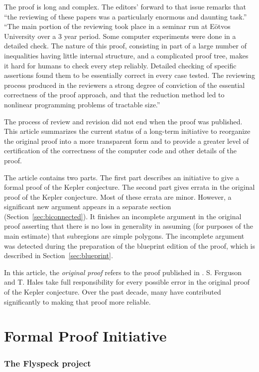 \documentclass[11pt]{amsart}
\begin{document}
The proof is long and complex.  The editors' forward to that issue remarks
that ``the reviewing of these papers was a particularly enormous and daunting task.''
``The main portion of the reviewing took place in a seminar run at E\"otvos University
over a 3 year period.  Some computer experiments were done in a detailed check.
The nature of this proof, consisting in part of a large number of inequalities having
little internal structure, and a complicated proof tree, makes it hard for humans
to check every step reliably.  Detailed checking of specific assertions found them to
be essentially correct in every case tested.  The reviewing process produced in the
reviewers a strong degree of conviction of the essential correctness of the proof
approach, and that the reduction method led to nonlinear programming problems of
tractable size.''

The process of review and revision did not end when the proof was published.
This article summarizes the current status of a long-term initiative to
reorganize the original proof into a more transparent form and to provide a greater
level of certification of the correctness of the computer code and other details of the proof.  

The article contains two parts.  The first part describes
an initiative to give a formal proof of the Kepler conjecture.  The second part gives errata in the original proof of the Kepler conjecture.  Most of these errata are minor.  However, a significant new argument appears in a separate section (Section~\ref{sec:biconnected}).  It finishes an incomplete argument in the original proof asserting that there is no loss in generality in assuming (for purposes of the main estimate) that subregions are simple polygons.  The incomplete argument was detected during the preparation of the blueprint edition of the proof, which is described in Section~\ref{sec:blueprint}.

In this article, the {\it original proof} refers to the proof published
in \cite{Hales:2006:DCG}.
S. Ferguson and T. Hales take full responsibility for every possible error in the original proof of the Kepler conjecture.  Over the past decade, many have contributed significantly to making that proof more reliable.


\part{Formal Proof Initiative}

\section{The Flyspeck project}
\end{document}
